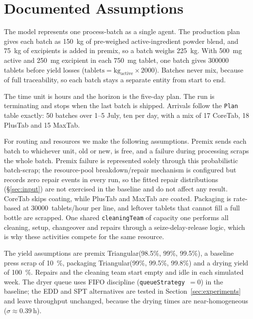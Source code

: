 \section{Documented Assumptions}
\label{sec:assumptions}

The model represents one process-batch as a single agent. The production plan
gives each batch as \SI{150}{\kilo\gram} of pre-weighed active-ingredient powder
blend, and \SI{75}{\kilo\gram} of excipients is added in premix, so a batch
weighs \SI{225}{\kilo\gram}. With \SI{500}{\milli\gram} active and
\SI{250}{\milli\gram} excipient in each \SI{750}{\milli\gram} tablet, one batch
gives \num{300000} tablets before yield losses
($\text{tablets} = \text{kg}_{\text{active}} \times 2000$). Batches never mix,
because of full traceability, so each batch stays a separate entity from start
to end.

The time unit is hours and the horizon is the five-day plan. The run is
terminating and stops when the last batch is shipped. Arrivals follow the
\texttt{Plan} table exactly: 50 batches over 1--5 July, ten per day, with a mix
of 17 CoreTab, 18 PlusTab and 15 MaxTab.

For routing and resources we make the following assumptions. Premix sends each
batch to whichever unit, old or new, is free, and a failure during processing
scraps the whole batch. Premix failure is represented solely through this
probabilistic batch-scrap; the resource-pool breakdown/repair mechanism is
configured but records zero repair events in every run, so the fitted repair
distributions (\S\ref{sec:input}) are not exercised in the baseline and do not
affect any result. CoreTab skips coating, while PlusTab and MaxTab are coated. Packaging is rate-based at \SI{30000}{tablets/hour} per line, and
leftover tablets that cannot fill a full bottle are scrapped. One shared
\texttt{cleaningTeam} of capacity one performs all cleaning, setup, changeover
and repairs through a seize-delay-release logic, which is why these activities
compete for the same resource.

The yield assumptions are premix Triangular(98.5\%, 99\%, 99.5\%), a baseline
press scrap of \SI{10}{\percent}, packaging Triangular(99\%, 99.5\%, 99.8\%) and
a drying yield of \SI{100}{\percent}. Repairs and the cleaning team start empty
and idle in each simulated week. The dryer queue uses FIFO discipline
(\texttt{queueStrategy}~$=0$) in the baseline; the EDD and SPT alternatives are
tested in Section~\ref{sec:experiments} and leave throughput unchanged, because
the drying times are near-homogeneous ($\sigma\approx\SI{0.39}{\hour}$).
